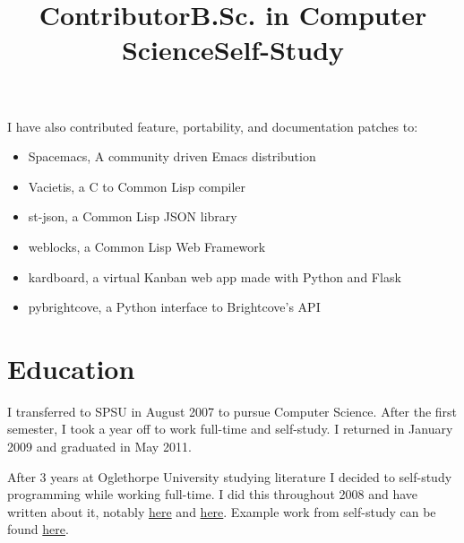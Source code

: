 \documentclass[margintitle,line]{res}
\begin{document}
\begin{resume}
\title{Contributor}
\dates{}
\begin{position}
  I have also contributed feature, portability, and documentation patches to:
  \begin{itemize}
    \item{Spacemacs, A community driven Emacs distribution}
    \item{Vacietis, a C to Common Lisp compiler}
    \item{st-json, a Common Lisp JSON library}
    \item{weblocks, a Common Lisp Web Framework}
    \item{kardboard, a virtual Kanban web app made with Python and Flask}
    \item{pybrightcove, a Python interface to Brightcove's API}
  \end{itemize}
\end{position}


\section{Education}

\title{B.Sc. in Computer Science}
\begin{position}
  I transferred to SPSU in August 2007 to pursue Computer Science.
  After the first semester, I took a year off to work full-time and self-study.
  I returned in January 2009 and graduated in May 2011.
\end{position}

\title{Self-Study}
\begin{position}
  After 3 years at Oglethorpe University studying literature
  I decided to self-study programming while working full-time.
  I did this throughout 2008 and have written about it, notably
  \href{http://blog.kingcons.io/posts/Leaving-College-to-Leverage-Compulsion.html}{here}
  and
  \href{http://blog.kingcons.io/posts/Spring-2008-Schedule-and-Syllabus.html}{here}.
  Example work from self-study can be found
  \href{http://blog.kingcons.io/posts/SICP-Section-13.html}{here}.
\end{position}



\end{resume}
\end{document}
